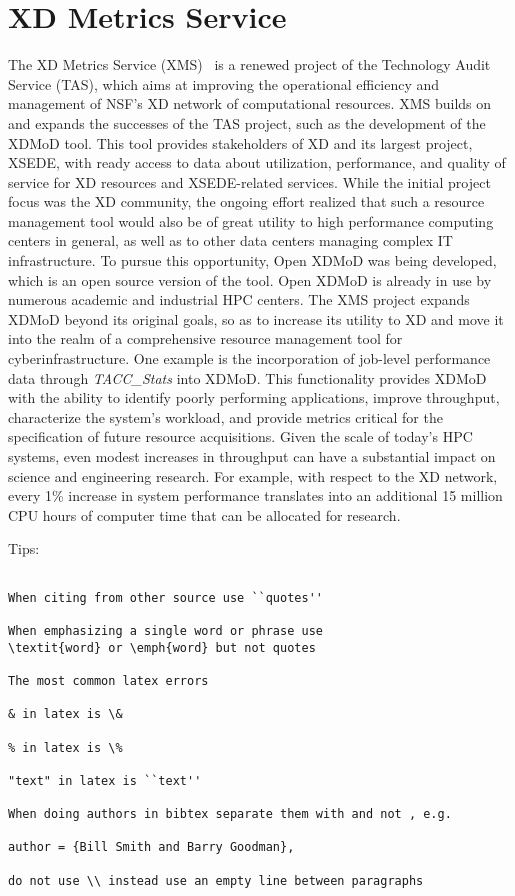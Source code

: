 \section{XD Metrics Service}

The XD Metrics Service (XMS)~\cite{hid-sample-vonLaszewski15tas} is a
renewed project of the Technology Audit Service (TAS), which aims at
improving the operational efficiency and management of NSF's XD
network of computational resources. XMS builds on and expands the
successes of the TAS project, such as the development of the XDMoD
tool. This tool provides stakeholders of XD and its
largest project, XSEDE, with ready access to data about utilization,
performance, and quality of service for XD resources and XSEDE-related
services. While the initial project focus was the XD community, the
ongoing effort realized that such a resource management tool would
also be of great utility to high performance computing centers in
general, as well as to other data centers managing complex IT
infrastructure. To pursue this opportunity, Open XDMoD was being
developed, which is an open source version of the tool. Open XDMoD is
already in use by numerous academic and industrial HPC centers. The
XMS project expands XDMoD beyond its original goals, so as to increase
its utility to XD and move it into the realm of a comprehensive
resource management tool for cyberinfrastructure. One example is the
incorporation of job-level performance data through
\textit{TACC\_Stats} into XDMoD. This functionality
provides XDMoD with the ability to identify poorly performing
applications, improve throughput, characterize the system's workload,
and provide metrics critical for the specification of future resource
acquisitions. Given the scale of today's HPC systems, even modest
increases in throughput can have a substantial impact on science and
engineering research. For example, with respect to the XD network,
every 1\% increase in system performance translates into an additional
15 million CPU hours of computer time that can be allocated for
research.

Tips:

\begin{verbatim}

When citing from other source use ``quotes''

When emphasizing a single word or phrase use 
\textit{word} or \emph{word} but not quotes

The most common latex errors 

& in latex is \&

% in latex is \%

"text" in latex is ``text''

When doing authors in bibtex separate them with and not , e.g. 

author = {Bill Smith and Barry Goodman},

do not use \\ instead use an empty line between paragraphs


\end{verbatim}

